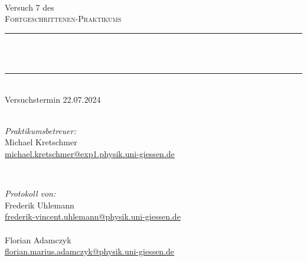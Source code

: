 \documentclass[12pt,a4paper,ngerman]{article}
\title{\mytitle} %
\author{Frederik Uhlemann, Florian Adamczyk}
\date{\today}
\makeatletter
\let\thetitle\@title
\makeatother
\begin{document}
		
	
	\begin{titlepage}
		\centering
		\vspace*{0.5 cm}
		\\[.5 cm]
		Versuch 7 des\\
		\textsc{\Large Fortgeschrittenen-Praktikums}\\ [0.3 cm]				%
		\rule{\linewidth}{0.2 mm} \\[0.4 cm]
		{ \huge \bfseries \thetitle}\\
		\rule{\linewidth}{0.2 mm}\\
		Versuchstermin 22.07.2024 \\
		~ \\
		[.5 cm]
		
		
		\begin{minipage}{0.49\textwidth}
			\begin{flushleft}
				 \emph{Praktikumsbetreuer:}\\
				 Michael Kretschmer\\
				 \small{\href{mailto:michael.kretschmer@exp1.physik.uni-giessen.de}{michael.kretschmer@exp1.physik.uni-giessen.de}}
			\end{flushleft}
		\end{minipage}~
		\begin{minipage}{0.49\textwidth}
			\begin{flushright}
				\emph{Protokoll von:} \\
				
				\large{Frederik Uhlemann}\\
				\small{\href{mailto:frederik-vincent.uhlemann@physik.uni-giessen.de}{frederik-vincent.uhlemann@physik.uni-giessen.de}\\~\\
				}
				\large{Florian Adamczyk} \\
				\small{\href{mailto:florian.marius.adamczyk@physik.uni-giessen.de}{florian.marius.adamczyk@physik.uni-giessen.de}\\
			}
		\end{flushright}
	\end{minipage}
	
	\end{titlepage}
	
\end{document}

